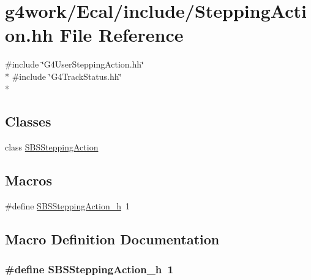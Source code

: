 \hypertarget{_stepping_action_8hh}{\section{g4work/\-Ecal/include/\-Stepping\-Action.hh File Reference}
\label{_stepping_action_8hh}
}
{\ttfamily \#include \char`\"{}G4\-User\-Stepping\-Action.\-hh\char`\"{}}\\*
{\ttfamily \#include \char`\"{}G4\-Track\-Status.\-hh\char`\"{}}\\*
\subsection*{Classes}
\begin{DoxyCompactItemize}
\item 
class \hyperlink{class_s_b_s_stepping_action}{S\-B\-S\-Stepping\-Action}
\end{DoxyCompactItemize}
\subsection*{Macros}
\begin{DoxyCompactItemize}
\item 
\#define \hyperlink{_stepping_action_8hh_afb2732b6cefa4ee35ffad8abfe924097}{S\-B\-S\-Stepping\-Action\-\_\-h}~1
\end{DoxyCompactItemize}


\subsection{Macro Definition Documentation}
\hypertarget{_stepping_action_8hh_afb2732b6cefa4ee35ffad8abfe924097}{
\subsubsection[{S\-B\-S\-Stepping\-Action\-\_\-h}]{\setlength{\rightskip}{0pt plus 5cm}\#define S\-B\-S\-Stepping\-Action\-\_\-h~1}}\label{_stepping_action_8hh_afb2732b6cefa4ee35ffad8abfe924097}
